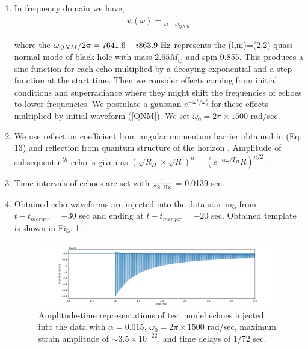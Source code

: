 \documentclass[12pt]{article}
\begin{document}
\begin{enumerate}

\item
In frequency domain we have,
\begin{eqnarray}
\psi (\omega)=\frac{1}{\omega - \omega_{QNM}} \label{QNM}
\end{eqnarray}

where the $\omega_{QNM}/2\pi=7641.6-i 863.9\ \rm{Hz}$ represents the (l,m)=(2,2) quasi-normal mode of black hole with mass $2.65 M_{\odot}$ and spin 0.855. This produces a sine function for each echo multiplied by a decaying exponential and a step function at the start time. Then we consider effects coming from initial conditions and superradiance where they might shift the frequencies of echoes to lower frequencies. We postulate a gaussian $e^{-\omega^{2}/\omega_{0}^{2}}$ for these effects multiplied by initial waveform (\ref{QNM}). We set $\omega_{0} = 2\pi\times 1500$ rad/sec.


\item We use reflection coefficient from angular momentum barrier obtained in \cite{Nakano:2017fvh} (Eq. 13) and reflection from quantum structure of the horizon \cite{Oshita:2018fqu}. Amplitude of subsequent n$^{th}$ echo is given as $\left(\sqrt{R_{H}} \times \sqrt{R} \right)^{n}=\left( {e^{-\alpha \omega/T_{H}}R} \right)^{n/2}$. 

\item Time intervals of echoes are set with $\frac{1}{72~ {\rm Hz}}$ = 0.0139 sec.

\item Obtained echo waveforms are injected into the data starting from $t-t_{merger}=-30$ sec and ending at $t-t_{merger}=-20$ sec. 
Obtained template is shown in Fig. \ref{echo_sequence}.
\begin{figure}[b]
    \includegraphics[width=1\textwidth]{echo_sequence.pdf}
 \caption{Amplitude-time representations of test model echoes injected into the data with $\alpha=0.015$, $\omega_{0}=2\pi \times 1500$ rad/sec, maximum strain amplitude of $\sim 3.5 \times 10^{-22}$, and time delays of 1/72 sec.}
 \label{echo_sequence}
\end{figure}


\end{enumerate}
\end{document}
